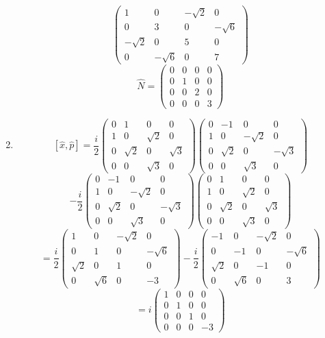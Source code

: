 \begin{sol}
\begin{enumerate}[label=\textbf{(\alph*)}]
$$\begin{pmatrix}
1&0&-\sqrt{2}&0\\0&3&0&-\sqrt{6}\\-\sqrt{2}&0&5&0\\0&-\sqrt{6}&0&7
\end{pmatrix}$$
$$\hat N=\begin{pmatrix}
0&0&0&0\\0&1&0&0\\0&0&2&0\\0&0&0&3
\end{pmatrix}$$
\item
$$[\hat x,\hat p]=\frac{i}{2}\begin{pmatrix}
0&1&0&0\\1&0&\sqrt{2}&0\\0&\sqrt{2}&0&\sqrt{3}\\0&0&\sqrt{3}&0
\end{pmatrix}\begin{pmatrix}
0&-1&0&0\\1&0&-\sqrt{2}&0\\0&\sqrt{2}&0&-\sqrt{3}\\0&0&\sqrt{3}&0
\end{pmatrix}$$
$$-\frac{i}{2}\begin{pmatrix}
0&-1&0&0\\1&0&-\sqrt{2}&0\\0&\sqrt{2}&0&-\sqrt{3}\\0&0&\sqrt{3}&0
\end{pmatrix}\begin{pmatrix}
0&1&0&0\\1&0&\sqrt{2}&0\\0&\sqrt{2}&0&\sqrt{3}\\0&0&\sqrt{3}&0
\end{pmatrix}$$
$$=\frac{i}{2}\begin{pmatrix}
1&0&-\sqrt{2}&0\\0&1&0&-\sqrt{6}\\\sqrt{2}&0&1&0\\0&\sqrt{6}&0&-3
\end{pmatrix}-\frac{i}{2}\begin{pmatrix}
-1&0&-\sqrt{2}&0\\0&-1&0&-\sqrt{6}\\\sqrt{2}&0&-1&0\\0&\sqrt{6}&0&3
\end{pmatrix}$$
$$=i\begin{pmatrix}
1&0&0&0\\0&1&0&0\\0&0&1&0\\0&0&0&-3

\end{pmatrix}$$
\end{enumerate}
\end{sol}
